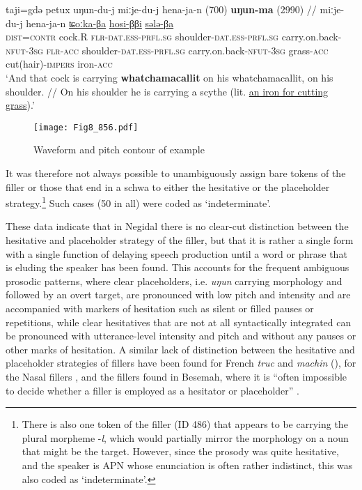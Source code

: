 \documentclass[output=paper]{langscibook}
\begin{document}
\ea \label{ex:pakendorf:11}
\gll taji=gdə
	petux
	uŋun-du-j
	miːje-du-j
	hena-ja-n
	\textup{(700)}
	\textbf{uŋun-ma}
	\textup{(2990)}
    //
	miːje-du-j
	hena-ja-n
	\uline{ʨoːka-βa}
	\uline{hosi-ββi}
	\uline{sələ-βa}\\
    \textsc{dist=contr}
	cock.R
	\textsc{flr-dat.ess-prfl.sg}
	shoulder-\textsc{dat.ess}-\textsc{prfl.sg}
	carry.on.back-\textsc{nfut-3sg}
	{}
	\textsc{flr-acc}
	{}
    {}
	shoulder-\textsc{dat.ess-prfl.sg}
	carry.on.back-\textsc{nfut-3sg}
	grass-\textsc{acc}
	cut(hair)-\textsc{impers}
	iron-\textsc{acc}\\
\glt ‘And that cock is carrying \textbf{whatchamacallit} on his whatchamacallit, on his shoulder. // On his shoulder he is carrying a scythe (lit. \uline{an iron for cutting grass}).’ 
\z
 
\begin{figure}
\texttt{[image: Fig8\_856.pdf]}
\caption{Waveform and pitch contour of example }
\label{fig:pakendorf:8}
\end{figure}

It was therefore not always possible to unambiguously assign bare tokens of the filler or those that end in a schwa to either the hesitative or the placeholder strategy.\footnote{There is also one token of the filler (ID 486) that appears to be carrying the plural morpheme -\textit{l}, which would partially mirror the morphology on a noun that might be the target. However, since the prosody was quite hesitative, and the speaker is APN whose enunciation is often rather indistinct, this was also coded as ‘indeterminate’.} Such cases (50 in all) were coded as ‘indeterminate’. 

These data indicate that in Negidal there is no clear-cut distinction between the hesitative and placeholder strategy of the filler, but that it is rather a single form with a single function of delaying speech production until a word or phrase that is eluding the speaker has been found. This accounts for the frequent ambiguous prosodic patterns, where clear placeholders, i.e. \textit{uŋun} carrying morphology and followed by an overt target, are pronounced with low pitch and intensity and are accompanied with markers of hesitation such as silent or filled pauses or repetitions, while clear hesitatives that are not at all syntactically integrated can be pronounced with utterance-level intensity and pitch and without any pauses or other marks of hesitation. A similar lack of distinction between the hesitative and placeholder strategies of fillers have been found for French \textit{truc} and \textit{machin} (\citealt{HenneckeMihatsch2022}), for the Nasal fillers \citep{chapters/billings_mcdonnell}, and the fillers found in Besemah, where it is “often impossible to decide whether a filler is employed as a hesitator or placeholder” \citep{chapters/mcdonnell_billings}. 
\end{document}

